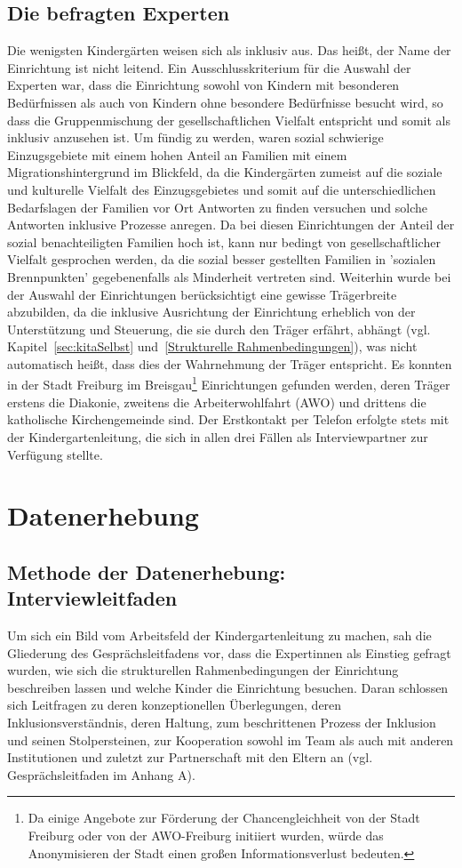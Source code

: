 \subsection{Die befragten Experten}
Die wenigsten Kindergärten weisen sich als inklusiv aus. Das heißt, der Name der Einrichtung ist nicht leitend. Ein Ausschlusskriterium für die Auswahl der Experten war, dass die Einrichtung sowohl von Kindern mit besonderen Bedürfnissen als auch von Kindern ohne besondere Bedürfnisse besucht wird, so dass die Gruppenmischung der gesellschaftlichen Vielfalt entspricht und somit als inklusiv anzusehen ist. Um fündig zu werden, waren sozial schwierige Einzugsgebiete mit einem hohen Anteil an Familien mit einem Migrationshintergrund im Blickfeld, da die Kindergärten zumeist auf die soziale und kulturelle Vielfalt des Einzugsgebietes und somit auf die unterschiedlichen Bedarfslagen der Familien vor Ort Antworten zu finden versuchen und solche Antworten inklusive Prozesse anregen. Da bei diesen Einrichtungen der Anteil der sozial benachteiligten Familien hoch ist, kann nur bedingt von gesellschaftlicher Vielfalt gesprochen werden, da die sozial besser gestellten Familien in ’sozialen Brennpunkten’ gegebenenfalls als Minderheit vertreten sind.    
Weiterhin wurde bei der Auswahl der Einrichtungen berücksichtigt eine gewisse Trägerbreite abzubilden, da die inklusive Ausrichtung der Einrichtung erheblich von der Unterstützung und Steuerung, die sie durch den Träger erfährt, abhängt (vgl. Kapitel~\ref{sec:kitaSelbst} und~\ref{Strukturelle Rahmenbedingungen}), was nicht automatisch heißt, dass dies der Wahrnehmung der Träger entspricht. Es konnten in der Stadt Freiburg im Breisgau\footnote{ Da einige Angebote zur Förderung der Chancengleichheit von der Stadt Freiburg oder von der AWO-Freiburg initiiert wurden, würde das Anonymisieren der Stadt einen großen Informationsverlust bedeuten.} Einrichtungen gefunden werden, deren Träger erstens die Diakonie, zweitens die Arbeiterwohlfahrt (AWO) und drittens die katholische Kirchengemeinde sind. Der Erstkontakt per Telefon erfolgte stets mit der Kindergartenleitung, die sich in allen drei Fällen als Interviewpartner zur Verfügung stellte. 

\section{Datenerhebung}
\subsection{Methode der Datenerhebung: Interviewleitfaden}
Um sich ein Bild vom Arbeitsfeld der Kindergartenleitung zu machen, sah die Gliederung des Gesprächsleitfadens vor, dass die Expertinnen als Einstieg gefragt wurden, wie sich die strukturellen Rahmenbedingungen der Einrichtung beschreiben lassen und welche Kinder die Einrichtung besuchen. Daran schlossen sich Leitfragen zu deren konzeptionellen Überlegungen, deren Inklusionsverständnis, deren Haltung, zum beschrittenen Prozess der Inklusion und seinen Stolpersteinen, zur Kooperation sowohl im Team als auch mit anderen Institutionen und zuletzt zur Partnerschaft mit den Eltern an (vgl. Gesprächsleitfaden im Anhang A).

